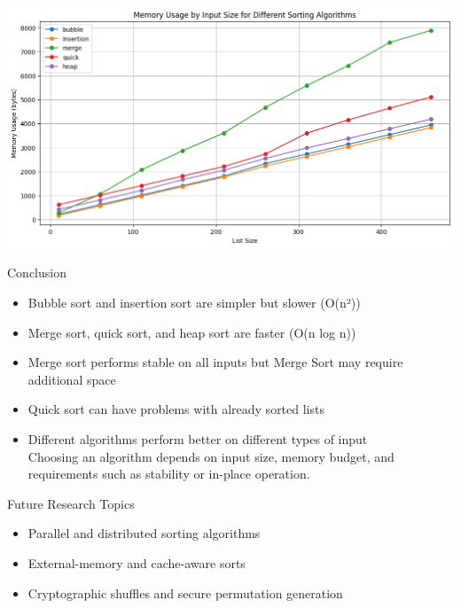 \documentclass[aspectratio=169]{beamer}
\begin{document}
\begin{frame}{}
  \vspace*{-2cm}
  \includegraphics[width=\textwidth]{graphs/memory.png}
\end{frame}

\begin{frame}{Conclusion}
\begin{itemize}
\item Bubble sort and insertion sort are simpler but slower (O(n²))
\item Merge sort, quick sort, and heap sort are faster (O(n log n))
\item Merge sort performs stable on all inputs but Merge Sort may require additional space
\item Quick sort can have problems with already sorted lists
\item Different algorithms perform better on different types of input\\
Choosing an algorithm depends on input size, memory budget, and requirements such as stability or in-place operation.

\end{itemize}
\end{frame}

\begin{frame}{Future Research Topics}
  \begin{itemize}
    \item Parallel and distributed sorting algorithms
    \item External-memory and cache-aware sorts
    \item Cryptographic shuffles and secure permutation generation
  \end{itemize}
\end{frame}
\end{document}
